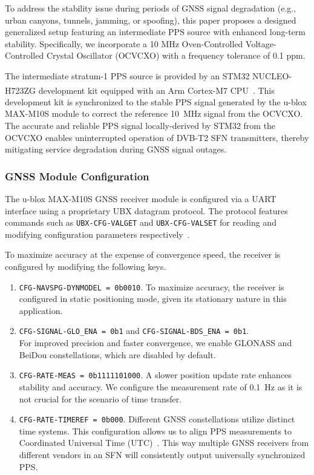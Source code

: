 \documentclass[12pt, a4paper]{extarticle}
\begin{document}
To address the stability issue during periods of GNSS signal degradation (e.g.,
urban canyons, tunnels, jamming, or spoofing), this paper proposes a designed
generalized setup featuring an intermediate PPS source with enhanced long-term
stability. Specifically, we incorporate a 10 MHz Oven-Controlled
Voltage-Controlled Crystal Oscillator (OCVCXO) with a frequency tolerance of
0.1 ppm.

The intermediate stratum-1 PPS source is provided by an STM32 NUCLEO-H723ZG
development kit equipped with an Arm\textsuperscript{\textregistered}
\mbox{Cortex\textsuperscript{\textregistered}-M7} CPU~\cite{st-nucleo}. This development
kit is synchronized to the stable PPS signal generated by the u-blox MAX-M10S
module to correct the reference 10~MHz signal from the OCVCXO. The accurate and
reliable PPS signal locally-derived by STM32 from the OCVCXO enables
uninterrupted operation of DVB-T2 SFN transmitters, thereby mitigating service
degradation during GNSS signal outages.

\subsubsection{GNSS Module Configuration}\label{section:gnss-config}

The u-blox MAX-M10S GNSS receiver module is configured via a UART interface
using a proprietary UBX datagram protocol. The protocol features
commands such as \texttt{UBX-CFG-VALGET} and \texttt{UBX-CFG-VALSET} for
reading and modifying configuration parameters respectively~\cite{m10-id}.

To maximize accuracy at the expense of convergence speed, the receiver is
configured by modifying the following keys.

\begin{enumerate}[noitemsep]
    \item \texttt{CFG-NAVSPG-DYNMODEL = 0b0010}.
        To maximize accuracy, the receiver is configured in static positioning
        mode, given its stationary nature in this application.
    \item \texttt{CFG-SIGNAL-GLO\_ENA = 0b1} and \texttt{CFG-SIGNAL-BDS\_ENA = 0b1}.\\
        For improved precision and faster convergence, we enable GLONASS and BeiDou
        constellations, which are disabled by default.
    \item \texttt{CFG-RATE-MEAS = 0b1111101000}.
        A slower position update rate enhances stability and accuracy. We
        configure the measurement rate of 0.1~Hz as it is not crucial for the
        scenario of time transfer.
    \item \texttt{CFG-RATE-TIMEREF = 0b000}.
        Different GNSS constellations utilize distinct time systems. This
        configuration allows us to align PPS measurements to Coordinated
        Universal Time (UTC)~\cite{m10s-im}. This way multiple GNSS receivers
        from different vendors in an SFN will consistently output universally
        synchronized PPS.
\end{enumerate}
\end{document}
